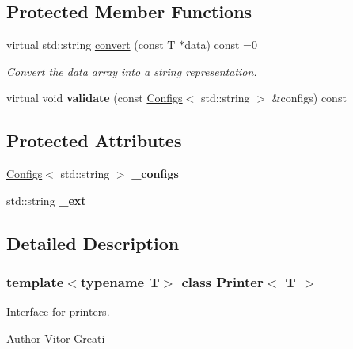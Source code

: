 \subsection*{Protected Member Functions}
\begin{DoxyCompactItemize}
\item 
virtual std\+::string \mbox{\hyperlink{class_printer_a18646b8fcd793f222023ea57e3f7353b}{convert}} (const T $\ast$data) const =0
\begin{DoxyCompactList}\small\item\em Convert the data array into a string representation. \end{DoxyCompactList}\item 
\mbox{\label{class_printer_a6082dcd65ab585fe3a03c4a11c804d48}} 
virtual void {\bfseries validate} (const \mbox{\hyperlink{class_configs}{Configs}}$<$ std\+::string $>$ \&configs) const
\end{DoxyCompactItemize}
\subsection*{Protected Attributes}
\begin{DoxyCompactItemize}
\item 
\mbox{\label{class_printer_aa3c38294a37e1bad353262dfa1bbbf94}} 
\mbox{\hyperlink{class_configs}{Configs}}$<$ std\+::string $>$ {\bfseries \+\_\+configs}
\item 
\mbox{\label{class_printer_a42506a039bf355b398a40501c1568729}} 
std\+::string {\bfseries \+\_\+ext}
\end{DoxyCompactItemize}


\subsection{Detailed Description}
\subsubsection*{template$<$typename T$>$\newline
class Printer$<$ T $>$}

Interface for printers. 

\begin{DoxyAuthor}{Author}
Vitor Greati 
\end{DoxyAuthor}


